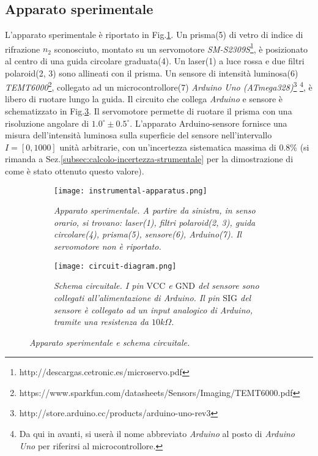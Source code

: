 \subsection{Apparato sperimentale}\label{subsec:apparato-sperimentale}
  L’apparato sperimentale è riportato in Fig.\ref{fig:apparato-strumentale}.
  Un prisma(5) di vetro di indice di rifrazione $n_2$ sconosciuto, montato su un servomotore \emph{SM-S2309S}\footnote{http://descargas.cetronic.es/microservo.pdf}, è posizionato al centro di una guida circolare graduata(4).
  Un laser(1) a luce rossa e due filtri polaroid(2, 3) sono
  allineati con il prisma. Un sensore di intensità luminosa(6) \emph{TEMT6000}\footnote{https://www.sparkfun.com/datasheets/Sensors/Imaging/TEMT6000.pdf},
  collegato ad un microcontrollore(7) \emph{Arduino Uno (ATmega328)}\footnote{http://store.arduino.cc/products/arduino-uno-rev3}%
  \footnote{Da qui in avanti, si userà il nome abbreviato \emph{Arduino} al posto di \emph{Arduino Uno} per riferirsi al microcontrollore.},
  è libero di ruotare lungo la guida.
  Il circuito che collega \emph{Arduino} e sensore è schematizzato in Fig.\ref{fig:diagramma-circuito}.
  Il servomotore permette di ruotare il prisma con una risoluzione angolare di ${1.0^\circ \pm 0.5^\circ}$.
  L'apparato Arduino-sensore fornisce una misura dell'intensità luminosa
  sulla superficie del sensore nell'intervallo $I = [0, 1000]$ unità arbitrarie,
  con un'incertezza sistematica massima di $0.8\%$ (si rimanda a Sez.\ref{subsec:calcolo-incertezza-strumentale}
  per la dimostrazione di come è stato ottenuto questo valore).
%
  \begin{figure}[h]
    \centering
    \begin{subfigure}{.4\textwidth}
      \texttt{[image: instrumental-apparatus.png]}
      \caption{
        \emph{
          Apparato sperimentale. A partire da sinistra, in senso orario,
          si trovano: laser(1), filtri polaroid(2, 3), guida circolare(4),
          prisma(5), sensore(6), Arduino(7). Il servomotore non è riportato.
        }
      }
      \label{fig:apparato-strumentale}
    \end{subfigure}%
    \hspace{20mm}
    \begin{subfigure}{.4\textwidth}
      \texttt{[image: circuit-diagram.png]}
      \caption{
        \emph{
          Schema circuitale. I pin $\text{VCC}$ e $\text{GND}$ del sensore sono collegati
          all'alimentazione di Arduino. Il pin $\text{SIG}$
          del sensore è collegato ad un input analogico di Arduino, tramite una
          resistenza da $10k\Omega$.
        }
      }
      \label{fig:diagramma-circuito}
    \end{subfigure}
    \caption{\emph{Apparato sperimentale e schema circuitale.}}
  \end{figure}
%
